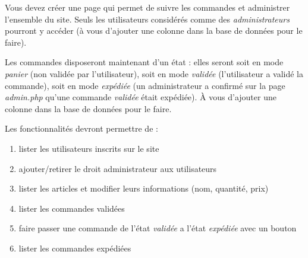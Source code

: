 

\vspace*{0.7cm}

\noindent {}

\bigskip

\noindent Vous devez créer une page  qui permet de suivre les commandes et administrer l'ensemble du site.
Seuls les utilisateurs considérés comme des \textit{administrateurs} pourront y accéder (à vous d'ajouter une colonne dans la base de données pour le faire).

\medskip

\noindent Les commandes disposeront maintenant d'un état : elles seront soit en mode \textit{panier} (non validée par l'utilisateur), soit en mode \textit{validée} (l'utilisateur a validé la commande), soit en mode \textit{expédiée} (un administrateur a confirmé sur la page \textit{admin.php} qu'une commande \textit{validée} était expédiée).
À vous d'ajouter une colonne dans la base de données pour le faire.

\medskip

\noindent Les fonctionnalités devront permettre de :

\begin{enumerate}
\item lister les utilisateurs inscrits sur le site
\item ajouter/retirer le droit administrateur aux utilisateurs
\item lister les articles et modifier leurs informations (nom, quantité, prix)
\item lister les commandes validées
\item faire passer une commande de l'état \textit{validée} a l'état \textit{expédiée} avec un bouton
\item lister les commandes expédiées
\end{enumerate}
